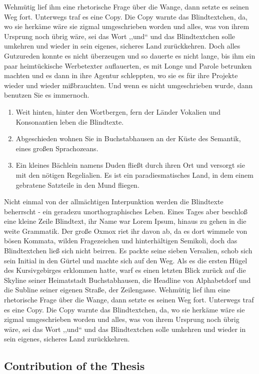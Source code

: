 \documentclass[12pt,a4paper,twoside]{scrartcl}
\numberwithin{equation}{section}
\begin{document}
Wehmütig lief ihm eine rhetorische Frage über die Wange, dann setzte es seinen Weg fort. Unterwegs traf es eine Copy. Die Copy warnte das Blindtextchen, da, wo sie herkäme wäre sie zigmal umgeschrieben worden und alles, was von ihrem Ursprung noch übrig wäre, sei das Wort ,,und`` und das Blindtextchen solle umkehren und wieder in sein eigenes, sicheres Land zurückkehren. Doch alles Gutzureden konnte es nicht überzeugen und so dauerte es nicht lange, bis ihm ein paar heimtückische Werbetexter auflauerten, es mit Longe und Parole betrunken machten und es dann in ihre Agentur schleppten, wo sie es für ihre Projekte wieder und wieder mißbrauchten. Und wenn es nicht umgeschrieben wurde, dann benutzen Sie es immernoch.
\begin{enumerate}
\item Weit hinten, hinter den Wortbergen, fern der Länder Vokalien und Konsonantien leben die Blindtexte.
\item Abgeschieden wohnen Sie in Buchstabhausen an der Küste des Semantik, eines großen Sprachozeans.
\item
Ein kleines Bächlein namens Duden fließt durch ihren Ort und versorgt sie mit den nötigen Regelialien. Es ist ein paradiesmatisches Land, in dem einem gebratene Satzteile in den Mund fliegen.
\end{enumerate}
Nicht einmal von der allmächtigen Interpunktion werden die Blindtexte beherrscht - ein geradezu unorthographisches Leben. Eines Tages aber beschloß eine kleine Zeile Blindtext, ihr Name war Lorem Ipsum, hinaus zu gehen in die weite Grammatik. Der große Oxmox riet ihr davon ab, da es dort wimmele von bösen Kommata, wilden Fragezeichen und hinterhältigen Semikoli, doch das Blindtextchen ließ sich nicht beirren. Es packte seine sieben Versalien, schob sich sein Initial in den Gürtel und machte sich auf den Weg. Als es die ersten Hügel des Kursivgebirges erklommen hatte, warf es einen letzten Blick zurück auf die Skyline seiner Heimatstadt Buchstabhausen, die Headline von Alphabetdorf und die Subline seiner eigenen Straße, der Zeilengasse. Wehmütig lief ihm eine rhetorische Frage über die Wange, dann setzte es seinen Weg fort. Unterwegs traf es eine Copy. Die Copy warnte das Blindtextchen, da, wo sie herkäme wäre sie zigmal umgeschrieben worden und alles, was von ihrem Ursprung noch übrig wäre, sei das Wort ,,und`` und das Blindtextchen solle umkehren und wieder in sein eigenes, sicheres Land zurückkehren.

\subsection{Contribution of the Thesis}
\end{document}
